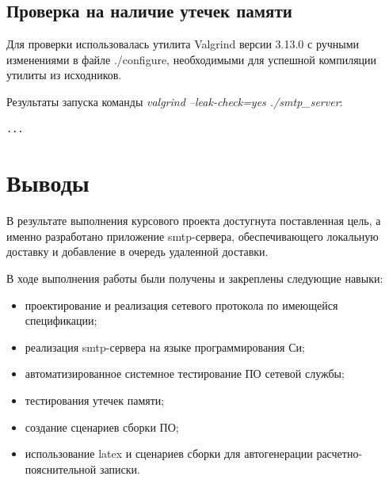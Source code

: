 \documentclass[a4paper,12pt]{report}
\begin{document}
\section{Проверка на наличие утечек памяти}

Для проверки использовалась утилита Valgrind версии 3.13.0 с ручными изменениями в файле ./configure, необходимыми для успешной компиляции утилиты из исходников.

Результаты запуска команды \textit{valgrind --leak-check=yes ./smtp_server}:

\begin{verbatim}
...
\end{verbatim}




\chapter*{Выводы}

В результате выполнения курсового проекта достугнута поставленная цель, а именно разработано приложение smtp-сервера, обеспечивающего локальную доставку и добавление в очередь удаленной доставки.

В ходе выполнения работы были получены и закреплены следующие навыки:
\begin{itemize}
    \item проектирование и реализация сетевого протокола по имеющейся спецификации;
    \item реализация smtp-сервера на языке программирования Си;
    \item автоматизированное системное тестирование ПО сетевой службы;
    \item тестирования утечек памяти; 
    \item создание сценариев сборки ПО;
    \item использование latex и сценариев сборки для автогенерации расчетно-пояснительной записки.
\end{itemize}
\end{document}
